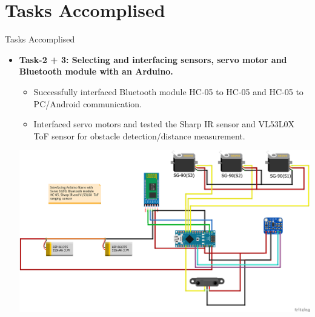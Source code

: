 \documentclass[10pt, a4paper]{beamer}
\begin{document}
\section{Tasks Accomplised}
\begin{frame}{Tasks Accomplised}
	\begin{itemize}
\item \textbf{Task-2 + 3: Selecting and interfacing sensors, servo motor and Bluetooth module with an Arduino.}
		\begin{itemize}
		  \item Successfully interfaced Bluetooth module HC-05 to HC-05 and HC-05 to PC/Android communication.
		  \item Interfaced servo motors and tested the Sharp IR sensor and VL53L0X ToF sensor for obstacle detection/distance measurement.
           \end{itemize}
           \centering\includegraphics[scale=0.2]{Arduino_interfacing.png}
	\end{itemize}
\end{frame}
\end{document}
